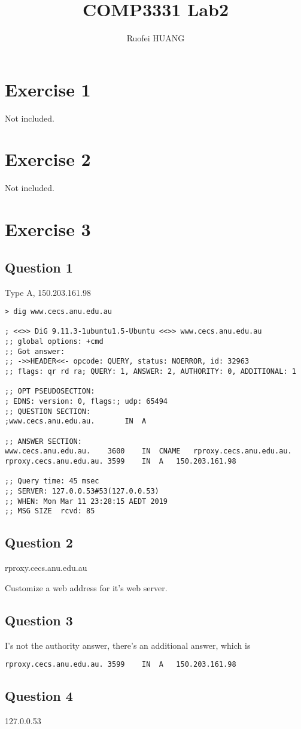 \documentclass{article}
\begin{document}
\title{COMP3331 Lab2}
\author{Ruofei HUANG}

\maketitle

\section{Exercise 1}
Not included.

\section{Exercise 2}
Not included.

\section{Exercise 3}

\subsection{Question 1}

Type A, 150.203.161.98

\begin{lstlisting}
> dig www.cecs.anu.edu.au

; <<>> DiG 9.11.3-1ubuntu1.5-Ubuntu <<>> www.cecs.anu.edu.au
;; global options: +cmd
;; Got answer:
;; ->>HEADER<<- opcode: QUERY, status: NOERROR, id: 32963
;; flags: qr rd ra; QUERY: 1, ANSWER: 2, AUTHORITY: 0, ADDITIONAL: 1

;; OPT PSEUDOSECTION:
; EDNS: version: 0, flags:; udp: 65494
;; QUESTION SECTION:
;www.cecs.anu.edu.au.		IN	A

;; ANSWER SECTION:
www.cecs.anu.edu.au.	3600	IN	CNAME	rproxy.cecs.anu.edu.au.
rproxy.cecs.anu.edu.au.	3599	IN	A	150.203.161.98

;; Query time: 45 msec
;; SERVER: 127.0.0.53#53(127.0.0.53)
;; WHEN: Mon Mar 11 23:28:15 AEDT 2019
;; MSG SIZE  rcvd: 85
\end{lstlisting}

\subsection{Question 2}

rproxy.cecs.anu.edu.au

Customize a web address for it's web server.

\subsection{Question 3}

I's not the authority answer, there's an additional answer, which is 

\begin{lstlisting}
rproxy.cecs.anu.edu.au.	3599	IN	A	150.203.161.98
\end{lstlisting}

\subsection{Question 4}

127.0.0.53
\end{document}
